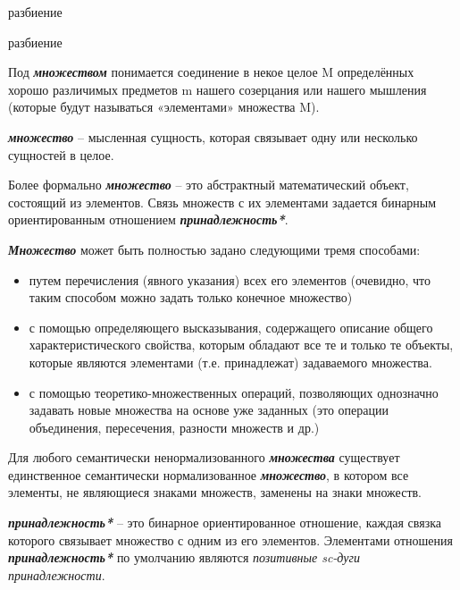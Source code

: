 \begin{scnrelfromset}{разбиение}
\end{scnrelfromset}

\begin{scnrelfromset}{разбиение}
\end{scnrelfromset}

Под \textbf{\textit{множеством}} понимается соединение в некое целое M определённых хорошо различимых предметов m нашего созерцания или нашего мышления (которые будут называться «элементами» множества M). 
	
\textbf{\textit{множество}} – мысленная сущность, которая связывает одну или несколько сущностей в целое.
	
Более формально \textbf{\textit{множество}} – это абстрактный математический объект, состоящий из элементов. Связь множеств с их элементами задается бинарным ориентированным отношением \textbf{\textit{принадлежность*}}.

\textbf{\textit{Множество}} может быть полностью задано следующими тремя способами:

\begin{itemize}
		\item путем перечисления (явного указания) всех его элементов (очевидно, что таким способом можно задать только конечное множество)
		\item с помощью определяющего высказывания, содержащего описание общего характеристического свойства, которым обладают все те и только те объекты, которые являются элементами (т.е. принадлежат) задаваемого множества.
		\item с помощью теоретико-множественных операций, позволяющих однозначно задавать новые множества на основе уже заданных (это операции объединения, пересечения, разности множеств и др.)
\end{itemize}

Для любого семантически ненормализованного \textbf{\textit{множества}} существует единственное семантически нормализованное \textbf{\textit{множество}}, в котором все элементы, не являющиеся знаками множеств, заменены на знаки множеств.




\textbf{\textit{принадлежность*}} – это бинарное ориентированное отношение, каждая связка которого связывает множество с одним из его элементов. Элементами отношения \textbf{\textit{принадлежность*}} по умолчанию являются \textit{позитивные sc-дуги принадлежности}.

